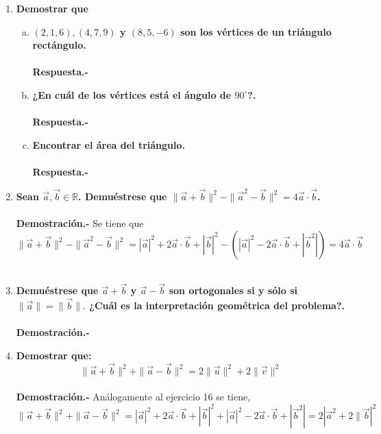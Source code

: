 \begin{enumerate}
\item \textbf{\boldmath Demostrar que}
    \begin{enumerate}[a)]

	\item \textbf{\boldmath $(2,1,6), (4,7,9)$ y $(8,5,-6)$ son los vértices de un triángulo rectángulo.\\\\
	    Respuesta.-}\; 

	\item \textbf{\boldmath ¿En cuál de los vértices está el ángulo de $90^\circ$?.\\\\
	    Respuesta.-}\; 

	\item \textbf{Encontrar el área del triángulo.\\\\
	    Respuesta.-}\;

    \end{enumerate}


\item \textbf{\boldmath Sean $\vec{a},\vec{b}\in \mathbb{R}$. Demuéstrese que $\|\vec{a}+\vec{b}\|^2-\|\vec{a}^2-\vec{b}\|^2=4\vec{a}\cdot \vec{b}$.\\\\
    Demostración.-}\; Se tiene que $$\|\vec{a}+\vec{b}\|^2-\|\vec{a}^2-\vec{b}\|^2=|\vec{a}|^2 + 2\vec{a}\cdot \vec{b} + | \vec{b} |^2 - \left(|\vec{a}|^2 - 2\vec{a} \cdot \vec{b} + |\vec{b}^2|\right)=4\vec{a} \cdot \vec{b}$$\\

\item \textbf{\boldmath Demuéstrese que $\vec{a}+\vec{b}$ y $\vec{a}-\vec{b}$ son ortogonales si y sólo si $\|\vec{a}\|=\|\vec{b}\|.$ ¿Cuál es la interpretación geométrica del problema?.\\\\
    Demostración.-}\; 

\item \textbf{\boldmath Demostrar que: $$\|\vec{a}+\vec{b}\|^2 + \|\vec{a}-\vec{b}\|^2 = 2\|\vec{u}\|^2+2\|\vec{v}\|^2$$\\
    Demostración.-}\; Análogamente al ejercicio 16 se tiene, 
    $$\|\vec{a}+\vec{b}\|^2 + \|\vec{a}-\vec{b}\|^2 = |\vec{a}|^2 + 2\vec{a}\cdot \vec{b} + |\vec{b}|^2 + |\vec{a}|^2 - 2\vec{a} \cdot \vec{b} + |\vec{b}^2| = 2|\vec{a}^2 + 2\|\vec{b}|^2$$\\


\end{enumerate}
